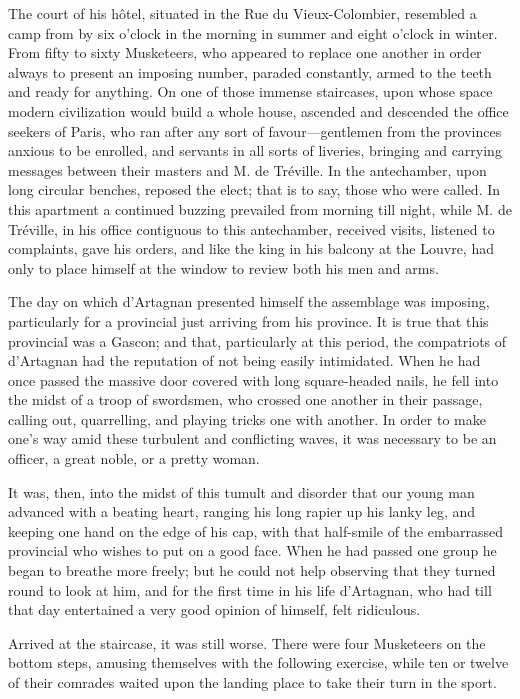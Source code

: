 The court of his hôtel, situated in the Rue du Vieux-Colombier, resembled a camp from by six o'clock in the morning in summer and eight o'clock in winter. From fifty to sixty Musketeers, who appeared to replace one another in order always to present an imposing number, paraded constantly, armed to the teeth and ready for anything. On one of those immense staircases, upon whose space modern civilization would build a whole house, ascended and descended the office seekers of Paris, who ran after any sort of favour---gentlemen from the provinces anxious to be enrolled, and servants in all sorts of liveries, bringing and carrying messages between their masters and M. de Tréville. In the antechamber, upon long circular benches, reposed the elect; that is to say, those who were called. In this apartment a continued buzzing prevailed from morning till night, while M. de Tréville, in his office contiguous to this antechamber, received visits, listened to complaints, gave his orders, and like the king in his balcony at the Louvre, had only to place himself at the window to review both his men and arms. 

The day on which d'Artagnan presented himself the assemblage was imposing, particularly for a provincial just arriving from his province. It is true that this provincial was a Gascon; and that, particularly at this period, the compatriots of d'Artagnan had the reputation of not being easily intimidated. When he had once passed the massive door covered with long square-headed nails, he fell into the midst of a troop of swordsmen, who crossed one another in their passage, calling out, quarrelling, and playing tricks one with another. In order to make one's way amid these turbulent and conflicting waves, it was necessary to be an officer, a great noble, or a pretty woman. 

It was, then, into the midst of this tumult and disorder that our young man advanced with a beating heart, ranging his long rapier up his lanky leg, and keeping one hand on the edge of his cap, with that half-smile of the embarrassed provincial who wishes to put on a good face. When he had passed one group he began to breathe more freely; but he could not help observing that they turned round to look at him, and for the first time in his life d'Artagnan, who had till that day entertained a very good opinion of himself, felt ridiculous. 

Arrived at the staircase, it was still worse. There were four Musketeers on the bottom steps, amusing themselves with the following exercise, while ten or twelve of their comrades waited upon the landing place to take their turn in the sport. 

